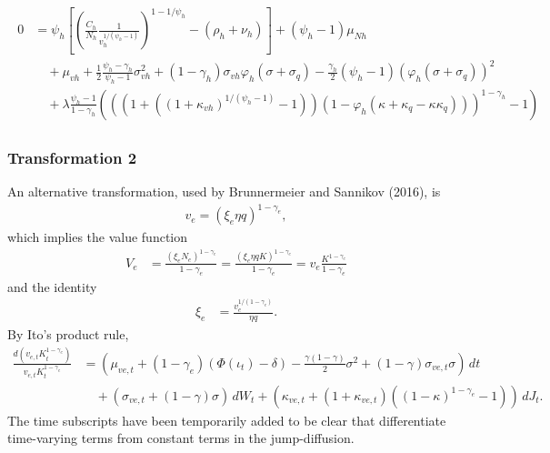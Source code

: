\documentclass[12 pt, oneside]{article}
\theoremstyle{definition}
\theoremstyle{definition}
\theoremstyle{definition}
\begin{document}
\begin{align}
\begin{split}
  \end{split}\\
  \begin{split}
   0 & = \psi_h\left[\left(\frac{C_h}{N_h}\frac{1}{v_h^{1 / (\psi_h - 1)}}  \right)^{1 - 1 / \psi_h} - (\rho_h + \nu_h)\right]+  (\psi_h - 1)\mu_{Nh}\\
& \quad+ \mu_{vh} + \frac{1}{2}\frac{\psi_h - \gamma_h}{\psi_h - 1}\sigma_{vh}^2   + (1 - \gamma_h)\sigma_{vh}\varphi_h(\sigma + \sigma_q) - \frac{\gamma_h}{2}(\psi_h - 1) (\varphi_h(\sigma + \sigma_q))^2  \\
&\quad + \lambda\frac{\psi_h - 1}{1 - \gamma_h}(((1 +  ((1 + \kappa_{vh})^{1 / (\psi_h - 1)} - 1))(1 - \varphi_h(\kappa + \kappa_q - \kappa\kappa_q)))^{1 - \gamma_h} - 1)
  \end{split}
\end{align}


\subsubsection{Transformation 2}

An alternative transformation, used by Brunnermeier and Sannikov (2016), is
\begin{align}
\label{eq:expert value function transformation 2}
v_e = (\xi_e \eta q)^{1 - \gamma_e},
\end{align}
which implies the value function
\begin{align*}
  V_e & = \frac{(\xi_e N_e)^{1 - \gamma_e}}{1 - \gamma_e} = \frac{(\xi_e \eta q K)^{1 - \gamma_e}}{1 - \gamma_e} = v_e\frac{K^{1 - \gamma_e}}{ 1- \gamma_e}
\end{align*}
and the identity
\begin{align*}
\xi_e & = \frac{v_e^{1 / ( 1- \gamma_e)}}{\eta q}.
\end{align*}
By Ito's product rule,
\begin{align*}
\frac{d(v_{e, t}K_t^{1 - \gamma_e})}{v_{e, t}K_t^{1 - \gamma_e}} & = \left(\mu_{ve, t} + (1 - \gamma_e)(\Phi(\iota_t) - \delta) - \frac{\gamma(1 - \gamma)}{2} \sigma^2 + (1 - \gamma)\sigma_{ve, t} \sigma\right) \,dt \\
                                                         &\quad + (\sigma_{ve, t} + (1 - \gamma)\sigma)\, dW_t + \left(\kappa_{ve, t} + (1 + \kappa_{ve, t})((1 - \kappa)^{1 - \gamma_e} - 1) \right)\, dJ_t.
\end{align*}
The time subscripts have been temporarily added to be clear that differentiate time-varying terms from constant terms in the jump-diffusion.
\end{document}
